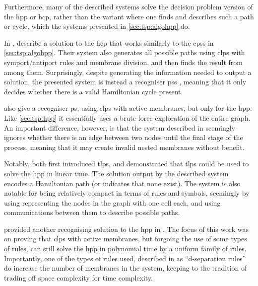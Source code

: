 Furthermore, many of the described systems solve the decision problem version of the \gls{hpp} or \gls{hcp}, rather than the variant where one finds and describes such a path or cycle, which the systems presented in \cref{sec:tsp:algohpp} do.


In \cite{Orellana-Martin2019a}, \citeauthor{Orellana-Martin2019a} describe a solution to the \gls{hcp} that works similarly to the \glspl{cps} in \cref{sec:tsp:algohpp}.  Their system also generates all possible paths using \gls{clps} with symport/antiport rules and membrane division, and then finds the result from among them.  Surprisingly, despite generating the information needed to output a solution, the presented system is instead a recogniser \glspl{ps} \cite[Ch.~12.2]{Paun2010b}, meaning that it only decides whether there is a valid Hamiltonian cycle present.


\citeauthor{Chen2009} \cite{Chen2009} also give a recogniser \gls{ps}, using \gls{clps} with active membranes, but only for the \gls{hpp}.  Like \cref{sec:tsp:hpp} it essentially uses a brute-force exploration of the entire graph.  An important difference, however, is that the system described in \cite{Chen2009} seemingly ignores whether there is an edge between two nodes until the final stage of the process, meaning that it may create invalid nested membranes without benefit.


Notably, \cite{Martin-Vide2003} both first introduced \gls{tlps}, and demonstrated that \gls{tlps} could be used to solve the \gls{hpp} in linear time.  The solution output by the described system encodes a Hamiltonian path (or indicates that none exist).  The system is also notable for being relatively compact in terms of rules and symbols, seemingly by using representing the nodes in the graph with one cell each, and using communications between them to describe possible paths.


\citeauthor{Pan2006} provided another recognising solution to the \gls{hpp} in \cite{Pan2006}.  The focus of this work was on proving that \gls{clps} with active membranes, but forgoing the use of some types of rules, can still solve the \gls{hpp} in polynomial time by a uniform family of rules.  Importantly, one of the types of rules used, described in \cite{Pan2006} as ``d-separation rules'' do increase the number of membranes in the system, keeping to the tradition of trading off space complexity for time complexity.

